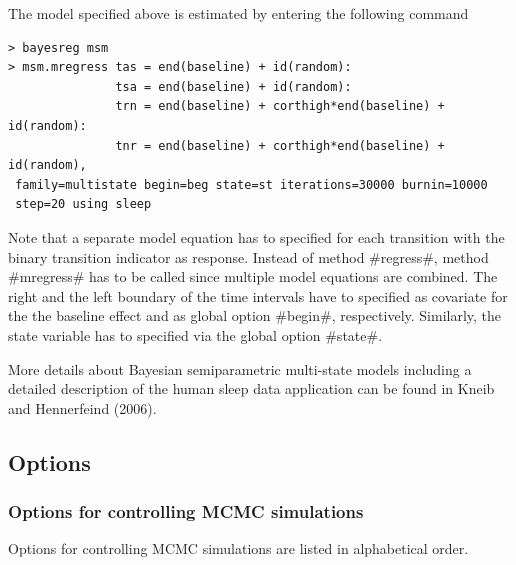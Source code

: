 The model specified above is estimated by entering the following
command

\begin{verbatim}
> bayesreg msm
> msm.mregress tas = end(baseline) + id(random):
               tsa = end(baseline) + id(random):
               trn = end(baseline) + corthigh*end(baseline) + id(random):
               tnr = end(baseline) + corthigh*end(baseline) + id(random),
 family=multistate begin=beg state=st iterations=30000 burnin=10000
 step=20 using sleep
\end{verbatim}

Note that a separate model equation has to specified for each
transition with the binary transition indicator as response.
Instead of method #regress#, method #mregress# has to be called
since multiple model equations are combined. The right and the
left boundary of the time intervals have to specified as covariate
for the the baseline effect and as global option #begin#,
respectively. Similarly, the state variable has to specified via
the global option #state#.

More details about Bayesian semiparametric multi-state models
including a detailed description of the human sleep data application
can be found in Kneib and Hennerfeind (2006).

\subsection{Options}
\label{regressoptions}

\vspace{0.4cm}

\subsubsection*{Options for controlling MCMC simulations}
\label{mcmc_options}

Options for controlling MCMC simulations are listed in
alphabetical order.

